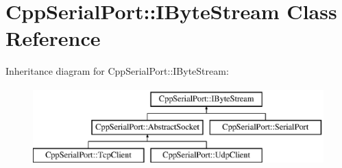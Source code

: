 \hypertarget{class_cpp_serial_port_1_1_i_byte_stream}{}\section{Cpp\+Serial\+Port\+:\+:I\+Byte\+Stream Class Reference}
\label{class_cpp_serial_port_1_1_i_byte_stream}
Inheritance diagram for Cpp\+Serial\+Port\+:\+:I\+Byte\+Stream\+:\begin{figure}[H]
\begin{center}
\leavevmode
\includegraphics[height=2.947368cm]{class_cpp_serial_port_1_1_i_byte_stream}
\end{center}
\end{figure}
